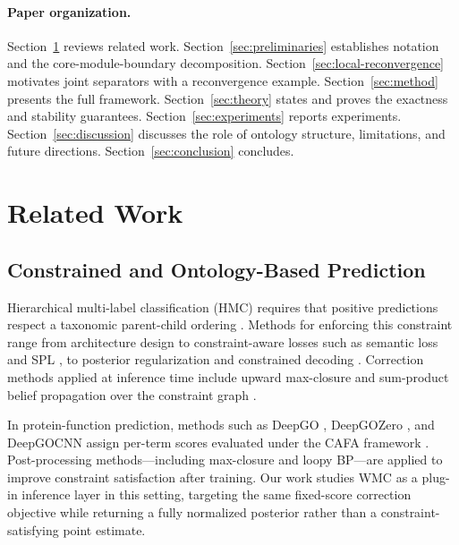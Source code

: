 \documentclass[12pt]{article}
\begin{document}
\paragraph{Paper organization.}
Section~\ref{sec:related-work} reviews related work.
Section~\ref{sec:preliminaries} establishes notation and the
core-module-boundary decomposition.
Section~\ref{sec:local-reconvergence} motivates joint separators with
a reconvergence example.
Section~\ref{sec:method} presents the full framework.
Section~\ref{sec:theory} states and proves the exactness and stability
guarantees.
Section~\ref{sec:experiments} reports experiments.
Section~\ref{sec:discussion} discusses the role of ontology structure,
limitations, and future directions.
Section~\ref{sec:conclusion} concludes.

\section{Related Work}
\label{sec:related-work}

\subsection{Constrained and Ontology-Based Prediction}

Hierarchical multi-label classification (HMC) requires that positive
predictions respect a taxonomic parent-child ordering
\citep{silla2011survey}. Methods for enforcing this constraint range
from architecture design \citep{giunchiglia2020chmcnn} to
constraint-aware losses such as semantic loss \citep{xu2018semanticloss}
and SPL \citep{ahmed2022spl}, to posterior regularization
\citep{ganchev2010posterior} and constrained decoding
\citep{diligenti2017semantic}. Correction methods applied at inference
time include upward max-closure \citep{obozinski2008consistent} and
sum-product belief propagation over the constraint graph
\citep{giunchiglia2020chmcnn}.

In protein-function prediction, methods such as DeepGO
\citep{kulmanov2018deepgo}, DeepGOZero \citep{kulmanov2022deepgozero},
and DeepGOCNN \citep{kulmanov2020deepgoplus} assign per-term scores
evaluated under the CAFA framework \citep{radivojac2013cafa,zhou2019cafa3}.
Post-processing methods---including max-closure and loopy BP---are
applied to improve constraint satisfaction after training. Our work
studies WMC as a plug-in inference layer in this setting, targeting the
same fixed-score correction objective while returning a fully normalized
posterior rather than a constraint-satisfying point estimate.
\end{document}
